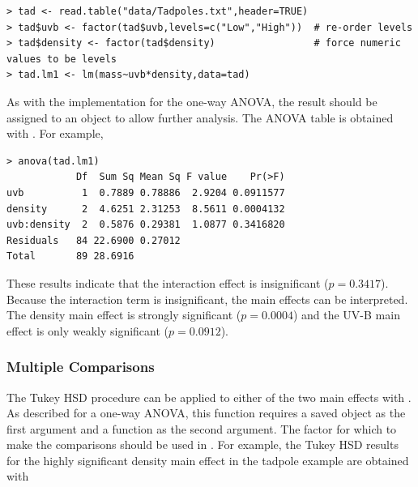 \documentclass[10pt,openany]{book}\usepackage[]{graphicx}\usepackage[]{color}
\makeatletter
\newenvironment{kframe}{%
 \def\at@end@of@kframe{}%
 \ifinner\ifhmode%
  \def\at@end@of@kframe{\end{minipage}}%
  \begin{minipage}{\columnwidth}%
 \fi\fi%
 \def\FrameCommand##1{\hskip\@totalleftmargin \hskip-\fboxsep
 \colorbox{shadecolor}{##1}\hskip-\fboxsep
     \hskip-\linewidth \hskip-\@totalleftmargin \hskip\columnwidth}%
 \MakeFramed {\advance\hsize-\width
   \@totalleftmargin\z@ \linewidth\hsize
   \@setminipage}}%
 {\par\unskip\endMakeFramed%
 \at@end@of@kframe}
\newenvironment{knitrout}{}{} %
\makeatother
\begin{document}
\begin{knitrout}
\color{fgcolor}\begin{kframe}
\begin{verbatim}
> tad <- read.table("data/Tadpoles.txt",header=TRUE)
> tad$uvb <- factor(tad$uvb,levels=c("Low","High"))  # re-order levels
> tad$density <- factor(tad$density)                 # force numeric values to be levels
> tad.lm1 <- lm(mass~uvb*density,data=tad)
\end{verbatim}
\end{kframe}
\end{knitrout}

As with the  implementation for the one-way ANOVA, the result should be assigned to an object to allow further analysis.  The ANOVA table is obtained with .  For example,

\begin{knitrout}
\color{fgcolor}\begin{kframe}
\begin{verbatim}
> anova(tad.lm1)
            Df  Sum Sq Mean Sq F value    Pr(>F)
uvb          1  0.7889 0.78886  2.9204 0.0911577
density      2  4.6251 2.31253  8.5611 0.0004132
uvb:density  2  0.5876 0.29381  1.0877 0.3416820
Residuals   84 22.6900 0.27012                  
Total       89 28.6916                          
\end{verbatim}
\end{kframe}
\end{knitrout}

These results indicate that the interaction effect is insignificant ($p=0.3417$).  Because the interaction term is insignificant, the main effects can be interpreted.  The density main effect is strongly significant ($p=0.0004$) and the UV-B main effect is only weakly significant ($p=0.0912$).

\subsubsection*{Multiple Comparisons}
The Tukey HSD procedure can be applied to either of the two main effects with .  As described for a one-way ANOVA, this function requires a saved  object as the first argument and a  function as the second argument.  The factor for which to make the comparisons should be used in .  For example, the Tukey HSD results for the highly significant density main effect in the tadpole example are obtained with
\end{document}
